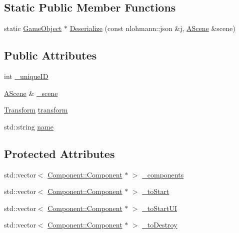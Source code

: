 \subsection*{Static Public Member Functions}
\begin{DoxyCompactItemize}
\item 
static \mbox{\hyperlink{class_beer_engine_1_1_game_object}{Game\+Object}} $\ast$ \mbox{\hyperlink{class_beer_engine_1_1_game_object_a1740ec5a74205514874f21a86c97b148}{Deserialize}} (const nlohmann\+::json \&j, \mbox{\hyperlink{class_beer_engine_1_1_a_scene}{A\+Scene}} \&scene)
\end{DoxyCompactItemize}
\subsection*{Public Attributes}
\begin{DoxyCompactItemize}
\item 
int \mbox{\hyperlink{class_beer_engine_1_1_game_object_a7520a234dc0f49d03deac22a6d4b8e19}{\+\_\+unique\+ID}}
\item 
\mbox{\hyperlink{class_beer_engine_1_1_a_scene}{A\+Scene}} \& \mbox{\hyperlink{class_beer_engine_1_1_game_object_ab987f198a11d307f0661672a9f57da1a}{\+\_\+scene}}
\item 
\mbox{\hyperlink{class_beer_engine_1_1_transform}{Transform}} \mbox{\hyperlink{class_beer_engine_1_1_game_object_ac17bf13885d36b7ae8b1164e1ec13a02}{transform}}
\item 
std\+::string \mbox{\hyperlink{class_beer_engine_1_1_game_object_a14a6872777d4a7be2c967a0169a7880a}{name}}
\end{DoxyCompactItemize}
\subsection*{Protected Attributes}
\begin{DoxyCompactItemize}
\item 
std\+::vector$<$ \mbox{\hyperlink{class_beer_engine_1_1_component_1_1_component}{Component\+::\+Component}} $\ast$ $>$ \mbox{\hyperlink{class_beer_engine_1_1_game_object_a068953c56e2d59b33077be6748a1a5c5}{\+\_\+components}}
\item 
std\+::vector$<$ \mbox{\hyperlink{class_beer_engine_1_1_component_1_1_component}{Component\+::\+Component}} $\ast$ $>$ \mbox{\hyperlink{class_beer_engine_1_1_game_object_aaaa5e7b81c4aeddd644e65afa5cc5f55}{\+\_\+to\+Start}}
\item 
std\+::vector$<$ \mbox{\hyperlink{class_beer_engine_1_1_component_1_1_component}{Component\+::\+Component}} $\ast$ $>$ \mbox{\hyperlink{class_beer_engine_1_1_game_object_a56b7077bd7769ce2130238b7ce2aad69}{\+\_\+to\+Start\+UI}}
\item 
std\+::vector$<$ \mbox{\hyperlink{class_beer_engine_1_1_component_1_1_component}{Component\+::\+Component}} $\ast$ $>$ \mbox{\hyperlink{class_beer_engine_1_1_game_object_af2ff6599a454c929d37745ff5afa050e}{\+\_\+to\+Destroy}}
\end{DoxyCompactItemize}


